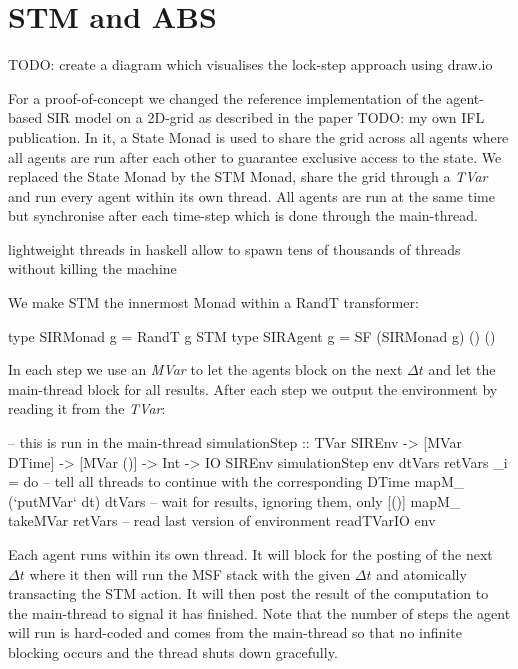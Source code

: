\section{STM and ABS}
\label{sec:stm_abs}

TODO: create a diagram which visualises the lock-step approach using draw.io

For a proof-of-concept we changed the reference implementation of the agent-based SIR model on a 2D-grid as described in the paper TODO: my own IFL publication. In it, a State Monad is used to share the grid across all agents where all agents are run after each other to guarantee exclusive access to the state. We replaced the State Monad by the STM Monad, share the grid through a \textit{TVar} and run every agent within its own thread. All agents are run at the same time but synchronise after each time-step which is done through the main-thread.

lightweight threads in haskell allow to spawn tens of thousands of threads without killing the machine

We make STM the innermost Monad within a RandT transformer:
\begin{HaskellCode}
type SIRMonad g   = RandT g STM
type SIRAgent g   = SF (SIRMonad g) () ()
\end{HaskellCode}

In each step we use an \textit{MVar} to let the agents block on the next $\Delta t$ and let the main-thread block for all results. After each step we output the environment by reading it from the \textit{TVar}:
\begin{HaskellCode}
-- this is run in the main-thread
simulationStep :: TVar SIREnv
               -> [MVar DTime]
               -> [MVar ()]
               -> Int
               -> IO SIREnv
simulationStep env dtVars retVars _i = do
  -- tell all threads to continue with the corresponding DTime
  mapM_ (`putMVar` dt) dtVars
  -- wait for results, ignoring them, only [()]
  mapM_ takeMVar retVars
  -- read last version of environment
  readTVarIO env
\end{HaskellCode}

Each agent runs within its own thread. It will block for the posting of the next $\Delta t$ where it then will run the MSF stack with the given $\Delta t$ and atomically transacting the STM action. It will then post the result of the computation to the main-thread to signal it has finished. Note that the number of steps the agent will run is hard-coded and comes from the main-thread so that no infinite blocking occurs and the thread shuts down gracefully.

